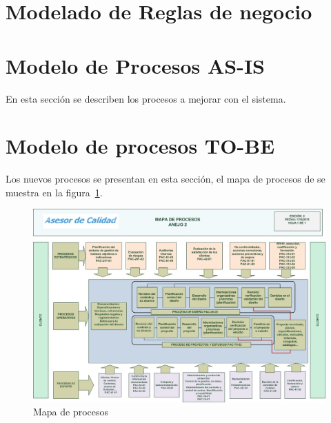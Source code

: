 \section{Modelado de Reglas de negocio}



\section{Modelo de Procesos AS-IS}

En esta sección se describen los procesos a mejorar con el sistema.



%
%

\section{Modelo de procesos TO-BE}

Los nuevos procesos se presentan en esta sección, el mapa de procesos de se muestra en la figura~\ref{fig:mapaProc}.

\begin{figure}[htbp]
	\begin{center}
		\includegraphics[width=.8\textwidth]{images/mapaProc}
		\caption{Mapa de procesos}
		\label{fig:mapaProc}
	\end{center}
\end{figure}



%
%
%

